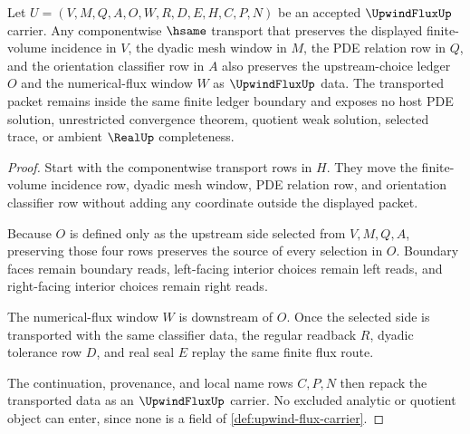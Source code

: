 \begin{theorem}
\label{thm:upwind-flux-ledger-stability}
Let $U=(V,M,Q,A,O,W,R,D,E,H,C,P,N)$ be an accepted $\UpwindFluxUp$ carrier. Any componentwise $\hsame$ transport that preserves the displayed finite-volume incidence in $V$, the dyadic mesh window in $M$, the PDE relation row in $Q$, and the orientation classifier row in $A$ also preserves the upstream-choice ledger $O$ and the numerical-flux window $W$ as $\UpwindFluxUp$ data. The transported packet remains inside the same finite ledger boundary and exposes no host PDE solution, unrestricted convergence theorem, quotient weak solution, selected trace, or ambient $\RealUp$ completeness.
\end{theorem}
\begin{proof}
Start with the componentwise transport rows in $H$. They move the finite-volume incidence row, dyadic mesh window, PDE relation row, and orientation classifier row without adding any coordinate outside the displayed packet.

Because $O$ is defined only as the upstream side selected from $V,M,Q,A$, preserving those four rows preserves the source of every selection in $O$. Boundary faces remain boundary reads, left-facing interior choices remain left reads, and right-facing interior choices remain right reads.

The numerical-flux window $W$ is downstream of $O$. Once the selected side is transported with the same classifier data, the regular readback $R$, dyadic tolerance row $D$, and real seal $E$ replay the same finite flux route.

The continuation, provenance, and local name rows $C,P,N$ then repack the transported data as an $\UpwindFluxUp$ carrier. No excluded analytic or quotient object can enter, since none is a field of \autoref{def:upwind-flux-carrier}.
\end{proof}



